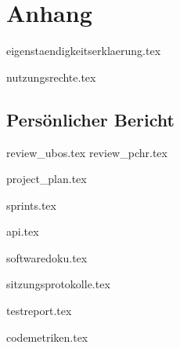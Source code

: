 \part*{Anhang}

\begin{comment}
In den Anhang gehört: Formulare (z.B. Eigenständigkeitserklärung, Nutzungsrechte, ...), Persönliche Reflektion, Projektplanung inkl. Risiko-Listen (Dokumentation der Versionen nach jeder Iteration), Zeitabrechnung nach sinnvollen Kategorien, Sitzungsprotokolle - das sind alles HSR-internen, nicht publizierte Dokumentationselemente (Abgabe nur für die Bewertung und Archivierung, in einer PDF-Datei)
\end{comment}

{eigenstaendigkeitserklaerung.tex}

{nutzungsrechte.tex}

\chapter{Persönlicher Bericht}
{review_ubos.tex}
{review_pchr.tex}

{project_plan.tex}

{sprints.tex}

{api.tex}

{softwaredoku.tex}

{sitzungsprotokolle.tex}

{testreport.tex}

{codemetriken.tex}